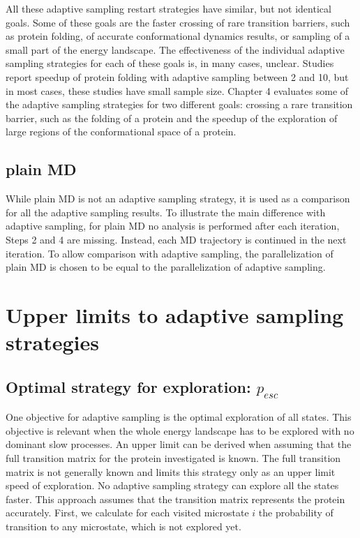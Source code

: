 All these adaptive sampling restart strategies have similar, but not identical goals.
Some of these goals are the faster crossing of rare transition barriers, such as protein folding, of accurate conformational dynamics results, or sampling of a small part of the energy landscape.
The effectiveness of the individual adaptive sampling strategies for each of these goals is, in many cases, unclear. Studies \cite{preto2014fast,weber2011characterization,bowman2010enhanced,Fabritiis-2014} report speedup of protein folding with adaptive sampling between 2 and 10, but in most cases, these studies have small sample size. Chapter 4 evaluates some of the adaptive sampling strategies for two different goals: crossing a rare transition barrier, such as the folding of a protein and the speedup of the exploration of large regions of the conformational space of a protein.

\subsection{plain MD} 

While plain MD is not an adaptive sampling strategy, it is used as a comparison for all the adaptive sampling results. To illustrate the main difference with adaptive sampling, for plain MD no analysis is performed after each iteration, Steps 2 and 4 are missing. Instead, each MD trajectory is continued in the next iteration. To allow comparison with adaptive sampling, the parallelization of plain MD is chosen to be equal to the parallelization of adaptive sampling.  

\section{Upper limits to adaptive sampling strategies}

\subsection{Optimal strategy for exploration: $p_{esc}$}

One objective for adaptive sampling is the optimal exploration of all states. This objective is relevant when the whole energy landscape has to be explored with no dominant slow processes. 
An upper limit can be derived when assuming that the full transition matrix for the protein investigated is known. The full transition matrix is not generally known and limits this strategy only as an upper limit speed of exploration. No adaptive sampling strategy can explore all the states faster. This approach assumes that the transition matrix represents the protein accurately.
First, we calculate for each visited microstate $i$ the probability of transition to any microstate, which is not explored yet.

